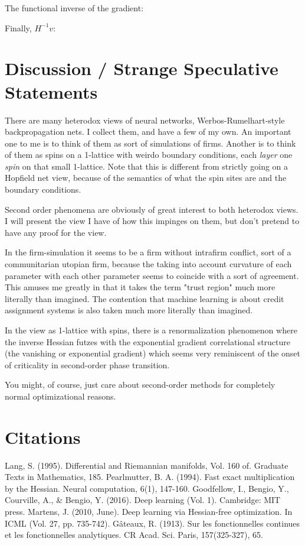 \documentclass{article}
\begin{document}
The functional inverse of the gradient:

Finally, $H^{-1}v$:


\section{Discussion / Strange Speculative Statements}

There are many heterodox views of neural networks, Werbos-Rumelhart-style backpropagation nets. I collect them, and have a few of my own. An important one to me is to think of them as sort of simulations of firms. Another is to think of them as spins on a 1-lattice with weirdo boundary conditions, each \textit{layer} one \textit{spin} on that small 1-lattice. Note that this is different from strictly going on a Hopfield net view, because of the semantics of what the spin sites are and the boundary conditions.

Second order phenomena are obviously of great interest to both heterodox views. I will present the view I have of how this impinges on them, but don't pretend to have any proof for the view.

In the firm-simulation it seems to be a firm without intrafirm conflict, sort of a communitarian utopian firm, because the taking into account curvature of each parameter with each other parameter seems to coincide with a sort of agreement. This amuses me greatly in that it takes the term "trust region" much more literally than imagined. The contention that machine learning is about credit assignment systems is also taken much more literally than imagined.

In the view as 1-lattice with spins, there is a renormalization phenomenon where the inverse Hessian futzes with the exponential gradient correlational structure (the vanishing or exponential gradient) which seems very reminiscent of the onset of criticality in second-order phase transition.

You might, of course, just care about second-order methods for completely normal optimizational reasons.

\section{Citations}

\begin{thebibliography}{9}
Lang, S. (1995). Differential and Riemannian manifolds, Vol. 160 of. Graduate Texts in Mathematics, 185.
Pearlmutter, B. A. (1994). Fast exact multiplication by the Hessian. Neural computation, 6(1), 147-160.
Goodfellow, I., Bengio, Y., Courville, A., \& Bengio, Y. (2016). Deep learning (Vol. 1). Cambridge: MIT press.
Martens, J. (2010, June). Deep learning via Hessian-free optimization. In ICML (Vol. 27, pp. 735-742).
G\^{a}teaux, R. (1913). Sur les fonctionnelles continues et les fonctionnelles analytiques. CR Acad. Sci. Paris, 157(325-327), 65.
\end{thebibliography}
\end{document}
